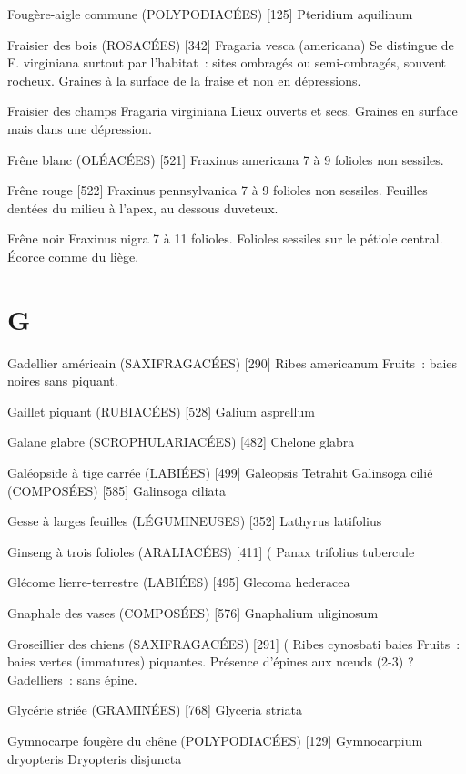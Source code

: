 Fougère-aigle commune (POLYPODIACÉES) [125]
				Pteridium aquilinum

Fraisier des bois (ROSACÉES)  [342]
				Fragaria vesca (americana)
Se distingue de F. virginiana surtout par l’habitat : sites ombragés ou semi-ombragés, souvent rocheux. Graines à la surface de la fraise et non en dépressions.

Fraisier des champs
				Fragaria virginiana
Lieux ouverts et secs. Graines en surface mais dans une dépression.

Frêne blanc (OLÉACÉES)  [521]
				Fraxinus americana
7 à 9 folioles non sessiles.



Frêne rouge  [522]
				Fraxinus pennsylvanica
7 à 9 folioles non sessiles. Feuilles dentées du milieu à l’apex, au dessous duveteux.

Frêne noir
				Fraxinus nigra
7 à 11 folioles. Folioles sessiles sur le pétiole central.
Écorce comme du liège.

\chapter*{G}

Gadellier américain (SAXIFRAGACÉES)  [290]
				Ribes americanum
Fruits : baies noires sans piquant.

Gaillet piquant (RUBIACÉES)  [528]
				Galium asprellum

Galane glabre (SCROPHULARIACÉES)  [482]
				Chelone glabra

Galéopside à tige carrée (LABIÉES)  [499]
				Galeopsis Tetrahit
Galinsoga cilié (COMPOSÉES)  [585]
				Galinsoga ciliata

Gesse à larges feuilles (LÉGUMINEUSES)  [352]
				Lathyrus latifolius

Ginseng à trois folioles (ARALIACÉES)  [411]		(
				Panax trifolius				tubercule

Glécome lierre-terrestre (LABIÉES)  [495]
				Glecoma hederacea

Gnaphale des vases (COMPOSÉES)  [576]
				Gnaphalium uliginosum

Groseillier des chiens (SAXIFRAGACÉES)  [291]			(
				Ribes cynosbati					baies
Fruits : baies vertes (immatures) piquantes.
Présence d’épines aux nœuds (2-3) ? Gadelliers : sans épine.

Glycérie striée (GRAMINÉES)  [768]
				Glyceria striata


Gymnocarpe fougère du chêne (POLYPODIACÉES) [129]
				Gymnocarpium dryopteris
				Dryopteris disjuncta

